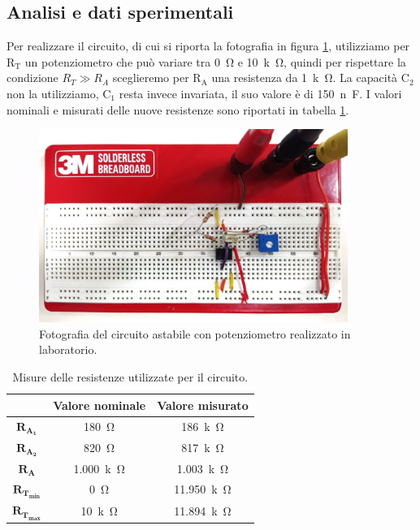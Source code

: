 \documentclass{report}
\begin{document}
\subsection{Analisi e dati sperimentali}
Per realizzare il circuito, di cui si riporta la fotografia in figura \ref{figura:circuito4}, utilizziamo per $\mathrm{R_T}$ un potenziometro che può variare tra \SI{0}{\ohm} e \SI{10}{k\ohm}, quindi per rispettare la condizione $\displaystyle{R_{T}\gg R_A}$ sceglieremo per $\mathrm{R_A}$ una resistenza da \SI{1}{k\ohm}. La capacità $\mathrm{C_2}$ non la utilizziamo, $\mathrm{C_1}$ resta invece invariata, il suo valore è di \SI{150}{n\farad}. I valori nominali e misurati delle nuove resistenze sono riportati in tabella \ref{table:res4}.
\begin{figure}[h!]
	\centering
	\includegraphics[height=6.3cm]{immagini/circuito4}
	\caption{Fotografia del circuito astabile con potenziometro realizzato in laboratorio.}
	\label{figura:circuito4}
\end{figure}
\begin{table}[h!]
	\centering
	\begin{tabular}{|c|c|c|}
		\cline{2-3} 
		\multicolumn{1}{c|}{} & \textbf{Valore nominale} & \textbf{Valore misurato}\\ 
		\hline
		$\mathbf{R_{A_1}}$ & \SI{180}{\ohm} & \SI{186}{k\ohm} \\ 
		\hline
		$\mathbf{R_{A_2}}$ & \SI{820}{\ohm} & \SI{817}{k\ohm} \\ 
		\hline
		$\mathbf{R_{A}}$ & \SI{1.000}{k\ohm} & \SI{1.003}{k\ohm} \\ 
		\hline
		$\mathbf{R_{T_{min}}}$ & \SI{0}{\ohm} & \SI{11.950}{k\ohm} \\ 
		\hline
		$\mathbf{R_{T_{max}}}$ & \SI{10}{k\ohm} & \SI{11.894}{k\ohm} \\ 
		\hline
	\end{tabular}
	\caption{Misure delle resistenze utilizzate per il circuito.}
	\label{table:res4}
\end{table}
\end{document}
